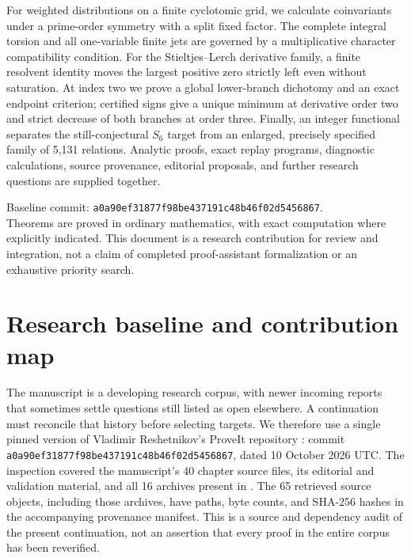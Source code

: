 \documentclass[11pt,a4paper]{article}
\numberwithin{equation}{section}
\theoremstyle{definition}
\theoremstyle{remark}
\newcommand{\snapshot}{\texttt{a0a90ef31877f98be437191c48b46f02d5456867}}
\begin{document}
\begin{titlepage}
\begin{minipage}{0.91\textwidth}
For weighted distributions on a finite cyclotomic grid, we calculate
coinvariants under a prime-order symmetry with a split fixed factor.
The complete integral torsion and all one-variable finite jets are
governed by a multiplicative character compatibility condition. For
the Stieltjes--Lerch derivative family, a finite resolvent identity
moves the largest positive zero strictly left even without saturation.
At index two we prove a global lower-branch dichotomy and an exact
endpoint criterion; certified signs give a unique minimum at derivative
order two and strict decrease of both branches at order three.
Finally, an integer functional separates the still-conjectural $S_6$
target from an enlarged, precisely specified family of 5,131 relations.
Analytic proofs, exact replay programs, diagnostic calculations,
source provenance, editorial proposals, and further research questions
are supplied together.
\end{minipage}
\vfill
\begin{minipage}{0.91\textwidth}
\small\color{muted}
Baseline commit: \snapshot.\\
Theorems are proved in ordinary mathematics, with exact computation
where explicitly indicated. This document is a research contribution
for review and integration, not a claim of completed proof-assistant
formalization or an exhaustive priority search.
\end{minipage}
\end{titlepage}
\hypersetup{pageanchor=true}
\begingroup
\small
\setlength{\parskip}{0pt}
\tableofcontents
\endgroup
\clearpage
{}
\section{Research baseline and contribution map}
\label{sec:introduction}

The manuscript is a developing research corpus, with newer incoming
reports that sometimes settle questions still listed as open elsewhere.
A continuation must reconcile that history before selecting targets.
We therefore use a single pinned version of Vladimir Reshetnikov's
ProveIt repository \cite{repo}: commit \snapshot, dated 10 October 2026
UTC. The inspection covered the manuscript's 40 chapter source files,
its editorial and validation material, and all 16 archives present in
. The 65 retrieved source objects, including those
archives, have paths, byte counts, and SHA-256 hashes in the accompanying
provenance manifest. This is a source and dependency audit of the present
continuation, not an assertion that every proof in the entire corpus
has been reverified.
\end{document}

